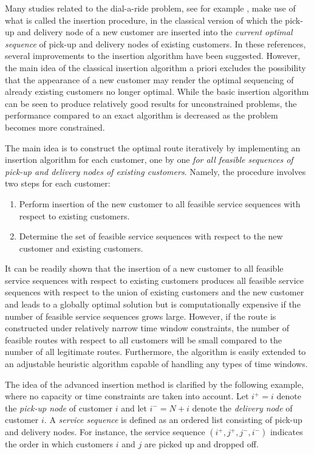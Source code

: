 \documentclass[dissertation,draft*]{aaltoseries}
\begin{document}
Many studies related to the dial-a-ride problem, see for example \cite{jaw,madsen,diana,wong},
make use of what is called the insertion procedure, in the classical version of which   
the pick-up and delivery node of a new customer are inserted into the 
\emph{current optimal sequence} of pick-up and delivery nodes of existing customers.
In these references, several improvements to the insertion algorithm 
have been suggested. However, the main idea of the classical insertion algorithm a priori
excludes the possibility that the appearance of a new customer may render
the optimal sequencing of already existing customers no longer optimal.
While the basic insertion algorithm can be seen to
produce relatively good results for unconstrained problems, 
the performance compared to an exact algorithm is decreased as the
problem becomes more constrained.

The main idea is to construct the optimal route iteratively by implementing 
an insertion algorithm for each customer, one by one \emph{for all feasible sequences 
of pick-up and delivery nodes of existing customers}.
Namely, the procedure involves two steps for each customer:
\begin{enumerate}
	\item 
	Perform insertion of the new customer to all feasible service sequences with respect to
	existing customers.
	\item
	Determine the set of feasible service sequences with respect to the new customer and existing customers.
\end{enumerate}

It can be readily shown that the insertion of a new customer to all feasible service sequences with respect to 
existing customers 
produces all feasible service sequences with respect to the union of existing customers 
and the new customer and leads to a globally optimal solution but is computationally expensive
if the number of feasible service sequences grows large. However, if the route is constructed under relatively narrow time window constraints,
the number of feasible routes with respect to all customers
will be small compared to the number of all legitimate routes. 
Furthermore, the algorithm is easily extended to an adjustable heuristic algorithm
capable of handling any types of time windows. 

The idea of the advanced insertion method is 
clarified by the following example, where no
capacity or time constraints are taken into account. 
Let $i^{+} = i$ denote the \emph{pick-up node} of customer $i$ and let $i^{-} = N + i$ denote 
the \emph{delivery node} of customer $i$.
A \emph{service sequence} is defined as an ordered list consisting of pick-up and delivery nodes.
For instance, the service sequence $( i^{+},  j^{+}, j^{-}, i^{-})$ indicates the order
in which customers $i$ and $j$ are picked up and dropped off.
\end{document}
